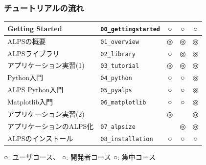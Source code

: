 \begin{frame}
  \frametitle{チュートリアルの流れ}
  \begin{tabular}{|l|l|c|c|c|}
        \hline
        Getting Started & {\tt 00\_gettingstarted} & {\footnotesize\color{red} ○} & {\footnotesize\color{blue} ○} & {\footnotesize\color{green} ○} \\
        \hline
        ALPSの概要 & {\tt 01\_overview} & {\footnotesize\color{red} ◎} & {\footnotesize\color{blue} ◎} & {\footnotesize\color{green} ◎} \\
        \hline
        ALPSライブラリ & {\tt 02\_library} & {\footnotesize\color{red} ○} & {\footnotesize\color{blue} ◎} & {\footnotesize\color{green} ◎} \\
        \hline
        アプリケーション実習(1) & {\tt 03\_tutorial} & {\footnotesize\color{red} ◎} & {\footnotesize\color{blue} ◎} & {\footnotesize\color{green} ◎} \\
        \hline
        Python入門 & {\tt 04\_python} & {\footnotesize\color{red} ○} & {\footnotesize\color{blue} ○} & {\footnotesize\color{green} ◎} \\
        \hline
        ALPS Python入門 & {\tt 05\_pyalps} & {\footnotesize\color{red} ○} & {\footnotesize\color{blue} ○} & {\footnotesize\color{green} ◎} \\
        \hline
        Matplotlib入門 & {\tt 06\_matplotlib} & {\footnotesize\color{red} ○} & {\footnotesize\color{blue} ○} & {\footnotesize\color{green} ◎} \\
        \hline
        アプリケーション実習(2) & & {\footnotesize\color{red} ◎} & {\footnotesize\color{blue} } & {\footnotesize\color{green} ◎} \\
        \hline
        アプリケーションのALPS化 & {\tt 07\_alpsize} & {\footnotesize\color{red} } & {\footnotesize\color{blue} ◎} & {\footnotesize\color{green} ◎} \\
        \hline
        ALPSのインストール & {\tt 08\_installation} & {\footnotesize\color{red} ○} & {\footnotesize\color{blue} ○} & {\footnotesize\color{green} ○} \\
        \hline
  \end{tabular}
  
  {\footnotesize\color{red} ○}: ユーザコース、{\footnotesize\color{blue} ○}: 開発者コース {\footnotesize\color{green} ○}: 集中コース
\end{frame}

